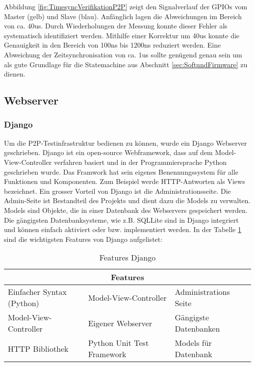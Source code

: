 Abbildung \ref{fig:TimesyncVerifikationP2P} zeigt den Signalverlauf der GPIOs vom Master (gelb) und Slave (blau). Anfänglich lagen die Abweichungen im Bereich von ca. 40us. Durch Wiederholungen der Messung konnte dieser Fehler als systematisch identifiziert werden. Mithilfe einer Korrektur um 40us konnte die Genauigkeit in den Bereich von 100ns bis 1200ns reduziert werden. Eine Abweichung der Zeitsynchronisation von ca. 1us sollte genügend genau sein um als gute Grundlage für die Statemachine aus Abschnitt \ref{sec:SoftundFirmware} zu dienen. 
 
 \newpage
\subsection{Webserver}\label{subsec:DjangoWebserver}
\subsubsection{Django}\label{subsubsec:Django}
Um die P2P-Testinfrastruktur bedienen zu können, wurde ein Django Webserver geschrieben. Django ist ein open-source Webframework, dass auf dem Model-View-Controller verfahren basiert und in der Programmiersprache Python geschrieben wurde. Das Framwork hat sein eigenes Benennungssystem für alle Funktionen und Komponenten. Zum Beispiel werde HTTP-Antworten als Views bezeichnet. Ein grosser Vorteil von Django ist die Administrationsseite. Die Admin-Seite ist Bestandteil des Projekts und dient dazu die Models zu verwalten. Models sind Objekte, die in einer Datenbank des Webservers gespeichert werden. Die gängigsten Datenbanksysteme, wie z.B. SQLLite sind in Django integriert und können einfach aktiviert oder bzw. implementiert werden. \cite{django_django_2020} In der Tabelle \ref{table:FeaturesDjango} sind die wichtigsten Features von Django aufgelistet:

\begin{table}[H]
	\centering
	\begin{adjustbox}{width=1\textwidth}
		\begin{tabular}{@{}|l|l|l|@{}}
			\toprule
			\multicolumn{3}{|c|}{\textbf{Features}}                                        \\ \midrule
			Einfacher Syntax (Python) & Model-View-Controller      & Administrations Seite \\ \midrule
			Model-View-Controller     & Eigener Webserver          & Gängigste Datenbanken \\ \midrule
			HTTP Bibliothek           & Python Unit Test Framework & Models für Datenbank  \\ \bottomrule
		\end{tabular}
	\end{adjustbox}
	\caption{Features Django \cite{django_django_2020}}
	\label{table:FeaturesDjango}
\end{table}

